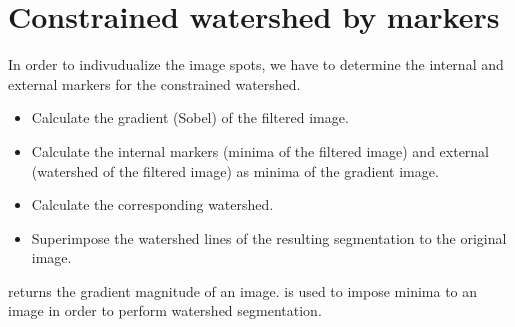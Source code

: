 \section{Constrained watershed by markers}
In order to indivudualize the image spots, we have to determine the internal and external markers for the constrained watershed.
\begin{qbox}
\begin{itemize}
  \item Calculate the gradient (Sobel) of the filtered image.
	\item Calculate the internal markers (minima of the filtered image) and external (watershed of the filtered image) as minima of the gradient image.
	\item Calculate the corresponding watershed.
	\item Superimpose the watershed lines of the resulting segmentation to the original image.
\end{itemize}
\end{qbox}

\begin{mcomment}
\begin{mremark}
  returns the gradient magnitude of an image.  is used to impose minima to an image in order to perform watershed segmentation.
\end{mremark}
\end{mcomment}

